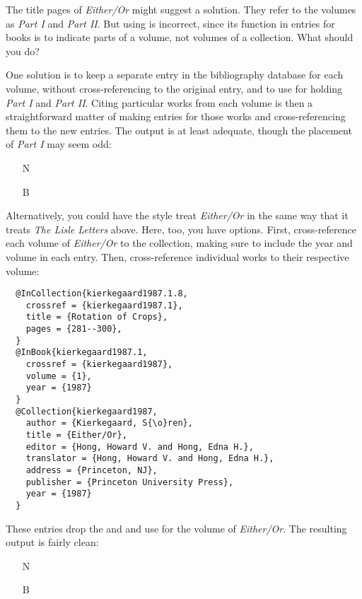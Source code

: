 \documentclass[11pt,letterpaper,oneside]{article}
\begin{document}
The title pages of \textit{Either/Or} might suggest a solution. They
refer to the volumes as \textit{Part I} and \textit{Part II}. But
using  is incorrect, since its function in entries for
books is to indicate parts of a volume, not volumes of a collection.
What should you do?

One solution is to keep a separate entry in the bibliography database
for each volume, without cross-referencing to the original entry, and
to use  for holding \textit{Part I} and \textit{Part
II}. Citing particular works from each volume is then a
straightforward matter of making  entries for
those works and cross-referencing them to the new 
entries. The output is at least adequate, though the placement of
\textit{Part I} may seem odd:

\begin{itemize}
\item[N] 

\item[B] 
\end{itemize}

\noindent Alternatively, you could have the style treat
\textit{Either/Or} in the same way that it treats \textit{The Lisle
Letters} above. Here, too, you have options. First, cross-reference
each volume of \textit{Either/Or} to the collection, making sure to
include the year and volume in each  entry. Then,
cross-reference individual works to their respective volume:

\begin{lstlisting}
  @InCollection{kierkegaard1987.1.8,
    crossref = {kierkegaard1987.1},
    title = {Rotation of Crops},
    pages = {281--300},
  }
  @InBook{kierkegaard1987.1,
    crossref = {kierkegaard1987},
    volume = {1},
    year = {1987}
  }
  @Collection{kierkegaard1987,
    author = {Kierkegaard, S{\o}ren},
    title = {Either/Or},
    editor = {Hong, Howard V. and Hong, Edna H.},
    translator = {Hong, Howard V. and Hong, Edna H.},
    address = {Princeton, NJ},
    publisher = {Princeton University Press},
    year = {1987}
  }
\end{lstlisting}

\noindent These entries drop the  and
 and use  for the volume of
\textit{Either/Or}. The resulting output is fairly clean:

\begin{itemize}
\item[N] 

\item[B] 
\end{itemize}
\end{document}
